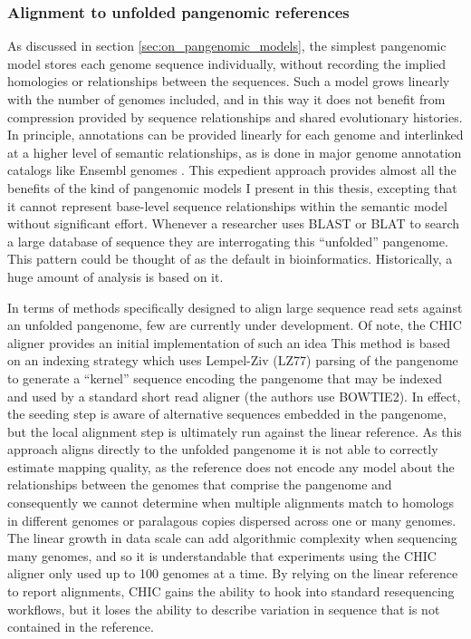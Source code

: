 \subsubsection{Alignment to unfolded pangenomic references}

As discussed in section \ref{sec:on_pangenomic_models}, the simplest pangenomic model stores each genome sequence individually, without recording the implied homologies or relationships between the sequences.
Such a model grows linearly with the number of genomes included, and in this way it does not benefit from compression provided by sequence relationships and shared evolutionary histories.
In principle, annotations can be provided linearly for each genome and interlinked at a higher level of semantic relationships, as is done in major genome annotation catalogs like Ensembl genomes \cite{kersey2015ensembl}.
This expedient approach provides almost all the benefits of the kind of pangenomic models I present in this thesis, excepting that it cannot represent base-level sequence relationships within the semantic model without significant effort.
Whenever a researcher uses BLAST or BLAT to search a large database of sequence they are interrogating this ``unfolded'' pangenome.
This pattern could be thought of as the default in bioinformatics.
Historically, a huge amount of analysis is based on it.

In terms of methods specifically designed to align large sequence read sets against an unfolded pangenome, few are currently under development.
Of note, the CHIC aligner provides an initial implementation of such an idea \cite{valenzuela2017chic}
This method is based on an indexing strategy which uses Lempel-Ziv (LZ77) \cite{ziv1977universal} parsing of the pangenome to generate a ``kernel'' sequence encoding the pangenome that may be indexed and used by a standard short read aligner (the authors use BOWTIE2).
In effect, the seeding step is aware of alternative sequences embedded in the pangenome, but the local alignment step is ultimately run against the linear reference.
As this approach aligns directly to the unfolded pangenome it is not able to correctly estimate mapping quality, as the reference does not encode any model about the relationships between the genomes that comprise the pangenome and consequently we cannot determine when multiple alignments match to homologs in different genomes or paralagous copies dispersed across one or many genomes.
The linear growth in data scale can add algorithmic complexity when sequencing many genomes, and so it is understandable that experiments using the CHIC aligner only used up to 100 genomes at a time.
By relying on the linear reference to report alignments, CHIC gains the ability to hook into standard resequencing workflows, but it loses the ability to describe variation in sequence that is not contained in the reference.

